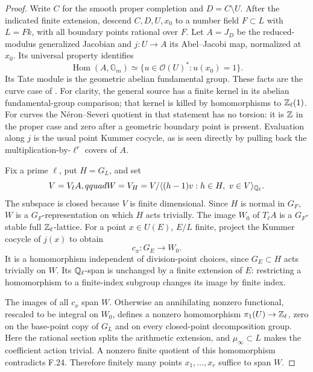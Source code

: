\begin{proof}
Write $C$ for the smooth proper completion and $D=C\setminus U$.
After the indicated finite extension, descend $C,D,U,x_0$ to
a number field $F\subset L$ with $L=Fk$, with all boundary
points rational over $F$. Let $A=J_D$ be the reduced-modulus
generalized Jacobian and $j:U\to A$ its Abel--Jacobi map,
normalized at $x_0$. Its universal property identifies
\[
 \operatorname{Hom}(A,\mathbb G_m)
 \simeq\{u\in\mathcal O(U)^*:u(x_0)=1\}.
\]
Its Tate module is the geometric abelian fundamental group.
These facts are the curve case of
\citet[Section~3 and Propositions~4.1--4.3]{F_SpiessSzamuely2003}.
For clarity, the general source has a finite kernel in its
abelian fundamental-group comparison; that kernel is killed by
homomorphisms to $\mathbb Z_\ell(1)$. For curves the N\'eron--Severi
quotient in that statement has no torsion: it is $\mathbb Z$ in the
proper case and zero after a geometric boundary point is present.
Evaluation along $j$ is the usual point Kummer cocycle, as is
seen directly by pulling back the multiplication-by-$\ell^r$
covers of $A$.

Fix a prime $\ell$, put $H=G_L$, and set
\[
 V=V_\ell A,qquad
 W=V_H=V/\langle(h-1)v:h\in H,\ v\in V\rangle_{\mathbb Q_\ell}.
\]
The subspace is closed because $V$ is finite dimensional.
Since $H$ is normal in $G_F$, $W$ is a $G_F$-representation
on which $H$ acts trivially. The image $W_0$ of $T_\ell A$
is a $G_F$-stable full $\mathbb Z_\ell$-lattice.
For a point $x\in U(E)$, $E/L$ finite, project the Kummer
cocycle of $j(x)$ to obtain
\[
 c_x:G_E\longrightarrow W_0.
\]
It is a homomorphism independent of division-point choices,
since $G_E\subset H$ acts trivially on $W$. Its
$\mathbb Q_\ell$-span is unchanged by a finite extension of $E$:
restricting a homomorphism to a finite-index subgroup changes
its image by finite index.

The images of all $c_x$ span $W$. Otherwise an annihilating
nonzero functional, rescaled to be integral on $W_0$, defines
a nonzero homomorphism $\pi_1(U)\to\mathbb Z_\ell$, zero on the
base-point copy of $G_L$ and on every closed-point decomposition
group. Here the rational section splits the arithmetic extension,
and $\mu_\infty\subset L$ makes the coefficient action trivial.
A nonzero finite quotient of this homomorphism contradicts
F.24. Therefore finitely many points $x_1,\ldots,x_r$ suffice
to span $W$.


\end{proof}
